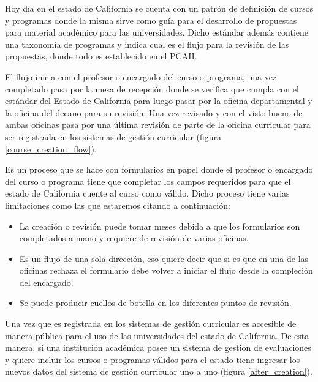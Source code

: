 Hoy día en el estado de California se cuenta con un patrón de definición de cursos y programas donde la misma sirve como guía para el desarrollo de propuestas para material académico para las universidades. Dicho estándar además contiene una taxonomía de programas y indica cuál es el flujo para la revisión de las propuestas, donde todo es establecido en el PCAH.

El flujo inicia con el profesor o encargado del curso o programa, una vez completado pasa por la mesa de recepción donde se verifica que cumpla con el estándar del Estado de California para luego pasar por la oficina departamental y la oficina del decano para su revisión. Una vez revisado y con el visto bueno de ambas oficinas pasa por una última revisión de parte de la oficina curricular para ser registrada en los sistemas de gestión curricular (figura \ref{course_creation_flow}).

Es un proceso que se hace con formularios en papel donde el profesor o encargado del curso o programa tiene que completar los campos requeridos para que el estado de California cuente al curso como válido. Dicho proceso tiene varias limitaciones como las que estaremos citando a continuación:
\begin{itemize}
	\item La creación o revisión puede tomar meses debida a que los formularios son completados a mano y requiere de revisión de varias oficinas.
	\item Es un flujo de una sola dirección, eso quiere decir que si es que en una de las oficinas rechaza el formulario debe volver a iniciar el flujo desde la compleción del encargado.
	\item Se puede producir cuellos de botella en los diferentes puntos de revisión.
\end{itemize}

Una vez que es registrada en los sistemas de gestión curricular es accesible de manera pública para el uso de las universidades del estado de California. De esta manera, si una institución académica posee un sistema de gestión de evaluaciones y quiere incluir los cursos o programas válidos para el estado tiene ingresar los nuevos datos del sistema de gestión curricular uno a uno (figura \ref{after_creation}).

